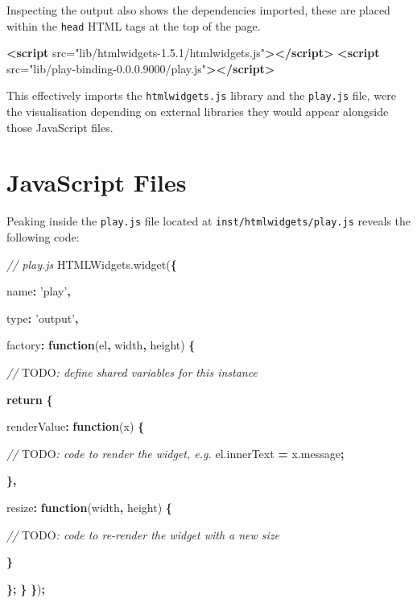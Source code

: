 \documentclass[10pt,]{krantz}
\makeatletter
\newenvironment{Shaded}{\begin{snugshade}}{\end{snugshade}}
\newcommand{\AlertTok}[1]{\textcolor[rgb]{0.33,0.33,0.33}{#1}}
\newcommand{\AttributeTok}[1]{\textcolor[rgb]{0.61,0.61,0.61}{#1}}
\newcommand{\CommentTok}[1]{\textcolor[rgb]{0.37,0.37,0.37}{\textit{#1}}}
\newcommand{\ControlFlowTok}[1]{\textcolor[rgb]{0.27,0.27,0.27}{\textbf{#1}}}
\newcommand{\DataTypeTok}[1]{\textcolor[rgb]{0.27,0.27,0.27}{#1}}
\newcommand{\KeywordTok}[1]{\textcolor[rgb]{0.27,0.27,0.27}{\textbf{#1}}}
\newcommand{\NormalTok}[1]{#1}
\newcommand{\OperatorTok}[1]{\textcolor[rgb]{0.43,0.43,0.43}{\textbf{#1}}}
\newcommand{\OtherTok}[1]{\textcolor[rgb]{0.37,0.37,0.37}{#1}}
\newcommand{\StringTok}[1]{\textcolor[rgb]{0.5,0.5,0.5}{#1}}
\newcommand{\VariableTok}[1]{\textcolor[rgb]{0,0,0}{#1}}
\newenvironment{kframe}{%
\medskip{}
\setlength{\fboxsep}{.8em}
 \def\at@end@of@kframe{}%
 \ifinner\ifhmode%
  \def\at@end@of@kframe{\end{minipage}}%
  \begin{minipage}{\columnwidth}%
 \fi\fi%
 \def\FrameCommand##1{\hskip\@totalleftmargin \hskip-\fboxsep
 \colorbox{shadecolor}{##1}\hskip-\fboxsep
     \hskip-\linewidth \hskip-\@totalleftmargin \hskip\columnwidth}%
 \MakeFramed {\advance\hsize-\width
   \@totalleftmargin\z@ \linewidth\hsize
   \@setminipage}}%
 {\par\unskip\endMakeFramed%
 \at@end@of@kframe}
\renewenvironment{Shaded}{\begin{kframe}}{\end{kframe}}
\makeatother
\begin{document}
Inspecting the output also shows the dependencies imported, these are placed within the \texttt{head} HTML tags at the top of the page.

\begin{Shaded}
\begin{Highlighting}[]
\KeywordTok{<script}\OtherTok{ src=}\StringTok{"lib/htmlwidgets-1.5.1/htmlwidgets.js"}\KeywordTok{></script>}
\KeywordTok{<script}\OtherTok{ src=}\StringTok{"lib/play-binding-0.0.0.9000/play.js"}\KeywordTok{></script>}
\end{Highlighting}
\end{Shaded}

This effectively imports the \texttt{htmlwidgets.js} library and the \texttt{play.js} file, were the visualisation depending on external libraries they would appear alongside those JavaScript files.

\hypertarget{widgets-first-js-files}{%
\section{JavaScript Files}\label{widgets-first-js-files}}

Peaking inside the \texttt{play.js} file located at \texttt{inst/htmlwidgets/play.js} reveals the following code:

\begin{Shaded}
\begin{Highlighting}[]
\CommentTok{// play.js}
\VariableTok{HTMLWidgets}\NormalTok{.}\AttributeTok{widget}\NormalTok{(}\OperatorTok{\{}

  \DataTypeTok{name}\OperatorTok{:} \StringTok{'play'}\OperatorTok{,}

  \DataTypeTok{type}\OperatorTok{:} \StringTok{'output'}\OperatorTok{,}

  \DataTypeTok{factory}\OperatorTok{:} \KeywordTok{function}\NormalTok{(el}\OperatorTok{,}\NormalTok{ width}\OperatorTok{,}\NormalTok{ height) }\OperatorTok{\{}

    \CommentTok{// }\AlertTok{TODO}\CommentTok{: define shared variables for this instance}

    \ControlFlowTok{return} \OperatorTok{\{}

      \DataTypeTok{renderValue}\OperatorTok{:} \KeywordTok{function}\NormalTok{(x) }\OperatorTok{\{}

        \CommentTok{// }\AlertTok{TODO}\CommentTok{: code to render the widget, e.g.}
        \VariableTok{el}\NormalTok{.}\AttributeTok{innerText} \OperatorTok{=} \VariableTok{x}\NormalTok{.}\AttributeTok{message}\OperatorTok{;}

      \OperatorTok{\},}

      \DataTypeTok{resize}\OperatorTok{:} \KeywordTok{function}\NormalTok{(width}\OperatorTok{,}\NormalTok{ height) }\OperatorTok{\{}

        \CommentTok{// }\AlertTok{TODO}\CommentTok{: code to re-render the widget with a new size}

      \OperatorTok{\}}

    \OperatorTok{\};}
  \OperatorTok{\}}
\OperatorTok{\}}\NormalTok{)}\OperatorTok{;}
\end{Highlighting}
\end{Shaded}
\end{document}
